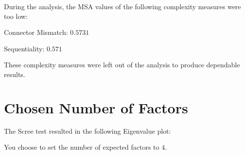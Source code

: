 \documentclass[a4paper]{article}
\begin{document}
\noindent
During the analysis, the MSA values of the following complexity measures were too low:
\begin{compactitem}
\item Connector Mismatch: $0.5731$
\item Sequentiality: $0.571$
\end{compactitem}
These complexity measures were left out of the analysis to produce dependable results.

\section*{Chosen Number of Factors}
The Scree test resulted in the following Eigenvalue plot:
\begin{center}
\end{center}
You choose to set the number of expected factors to $4$.
\end{document}
